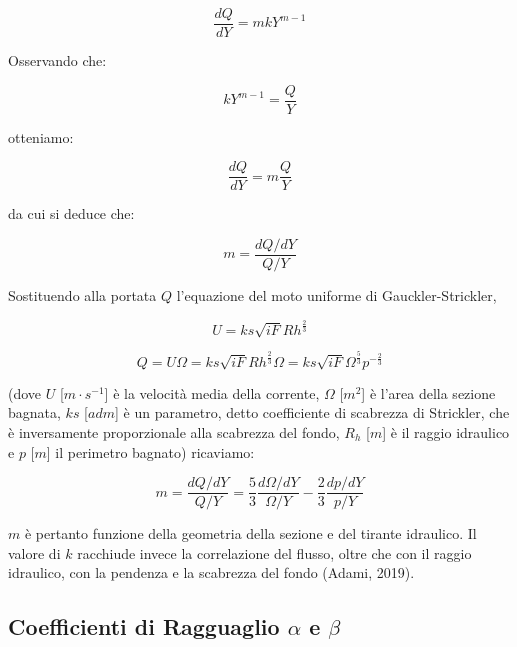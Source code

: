 \documentclass[12pt]{article} %
\begin{document}
\begin{equation}
    \frac{dQ}{dY}=mkY^{m-1}
    \label{eqn:m_1}
\end{equation}

\noindent Osservando che:

\begin{equation}
   kY^{m-1}=\frac{Q}{Y}
   \label{eqn:m_2}
\end{equation}

\noindent otteniamo:

\begin{equation}
    \frac{dQ}{dY}=m\frac{Q}{Y}
    \label{eqn:m_3}
\end{equation}

\noindent da cui si deduce che:

\begin{equation}
    m=\frac{dQ/dY}{Q/Y}
    \label{eqn:m_4}
\end{equation}

\noindent Sostituendo alla portata $Q$ l’equazione del moto uniforme di Gauckler-Strickler,
  
\begin{equation}
    U=ks\sqrt{iF}Rh^{\frac{2}{3}}
    \label{eqn:U_Gauckler-Strickler}
\end{equation}  
  
\begin{equation}
    Q=U\Omega=ks\sqrt{iF}Rh^{\frac{2}{3}}\Omega=ks\sqrt{iF}\Omega^{\frac{5}{3}}p^{-\frac{2}{3}}
    \label{eqn:Q_Gauckler-Strickler}
\end{equation}

\noindent (dove $U$ [$m\cdot s^{-1}$] è la velocità media della corrente, $\Omega$ [$m^2$] è l’area della sezione bagnata, $ks$ [$adm$] è un parametro, detto coefficiente di scabrezza di Strickler, che è inversamente proporzionale alla scabrezza del fondo, $R_h$ [$m$] è il raggio idraulico e $p$ [$m$] il perimetro bagnato) ricaviamo:

\begin{equation}
   m=\frac{dQ/dY}{Q/Y}=\frac{5}{3}\frac{d\Omega/dY}{\Omega/Y}-\frac{2}{3}\frac{dp/dY}{p/Y}
   \label{eqn:m_5}
\end{equation}

\noindent $m$ è pertanto funzione della geometria della sezione e del tirante idraulico. 
Il valore di $k$ racchiude invece la correlazione del flusso, oltre che con il raggio idraulico, con la pendenza e la scabrezza del fondo (Adami, 2019).

\subsection{\texorpdfstring{Coefficienti di Ragguaglio $\alpha$ e $\beta$}{} }
\end{document}
